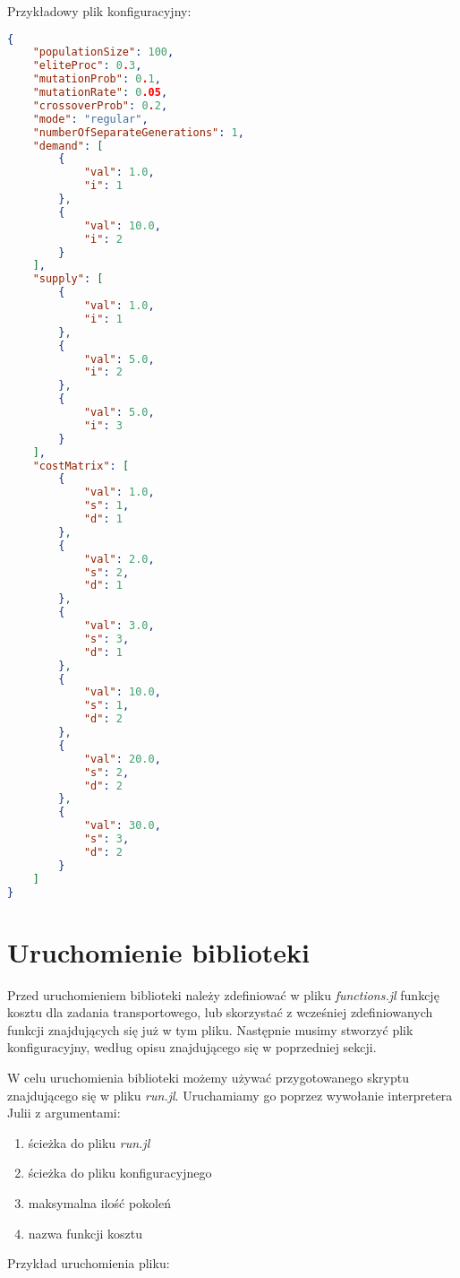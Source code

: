 Przykładowy plik konfiguracyjny:

\begin{lstlisting}[language=json, firstnumber=1, frame=single]
{
    "populationSize": 100,
    "eliteProc": 0.3,
    "mutationProb": 0.1,
    "mutationRate": 0.05,
    "crossoverProb": 0.2,
    "mode": "regular",
    "numberOfSeparateGenerations": 1,
    "demand": [
        {
            "val": 1.0,
            "i": 1
        },
        {
            "val": 10.0,
            "i": 2
        }
    ],
    "supply": [
        {
            "val": 1.0,
            "i": 1
        },
        {
            "val": 5.0,
            "i": 2
        },
        {
            "val": 5.0,
            "i": 3
        }
    ],
    "costMatrix": [
        {
            "val": 1.0,
            "s": 1,
            "d": 1
        },
        {
            "val": 2.0,
            "s": 2,
            "d": 1
        },
        {
            "val": 3.0,
            "s": 3,
            "d": 1
        },
        {
            "val": 10.0,
            "s": 1,
            "d": 2
        },
        {
            "val": 20.0,
            "s": 2,
            "d": 2
        },
        {
            "val": 30.0,
            "s": 3,
            "d": 2
        }
    ]
}
\end{lstlisting}

\section{Uruchomienie biblioteki}

Przed uruchomieniem biblioteki należy zdefiniować w pliku \textit{functions.jl} funkcję kosztu dla zadania transportowego, lub skorzystać z 
wcześniej zdefiniowanych funkcji znajdujących się już w tym pliku. Następnie musimy stworzyć plik konfiguracyjny, według opisu znajdującego 
się w poprzedniej sekcji.

W celu uruchomienia biblioteki możemy używać przygotowanego skryptu znajdującego się w pliku \textit{run.jl}. Uruchamiamy go poprzez wywołanie 
interpretera Julii z argumentami:
\begin{enumerate}
    \item ścieżka do pliku \textit{run.jl}
    \item ścieżka do pliku konfiguracyjnego 
    \item maksymalna ilość pokoleń
    \item nazwa funkcji kosztu
\end{enumerate}

Przykład uruchomienia pliku:

